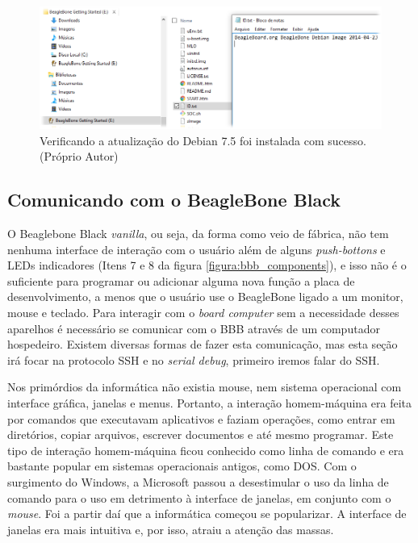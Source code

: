 \begin{figure}[h]
	\centering
	\includegraphics[width=\textwidth]{figuras/check_bbb_version.png}
	\caption{Verificando a atualização do Debian 7.5 foi instalada com sucesso. (Próprio Autor)}
	\label{figura:check_bbb_version}
\end{figure}

\subsection{Comunicando com o BeagleBone Black}

O Beaglebone Black \emph{vanilla}, ou seja, da forma como veio de fábrica, não tem nenhuma interface de interação com o usuário além de alguns \emph{push-bottons} e LEDs indicadores (Itens 7 e 8 da figura \ref{figura:bbb_components}), e isso não é o suficiente para programar ou adicionar alguma nova função a placa de desenvolvimento, a menos que o usuário use o BeagleBone ligado a um monitor, mouse e teclado. Para interagir com o \emph{board computer} sem a necessidade desses aparelhos é necessário se comunicar com o BBB através de um computador hospedeiro. Existem diversas formas de fazer esta comunicação, mas esta seção irá focar na protocolo SSH e no \emph{serial debug}, primeiro iremos falar do SSH.

Nos primórdios da informática não existia mouse, nem sistema operacional com interface gráfica, janelas e menus. Portanto, a interação homem-máquina era feita por comandos que executavam aplicativos e faziam operações, como entrar em diretórios, copiar arquivos, escrever documentos e até mesmo programar. Este tipo de interação homem-máquina ficou conhecido como linha de comando e era bastante popular em sistemas operacionais antigos, como DOS. Com o surgimento do Windows, a Microsoft passou a desestimular o uso da linha de comando para o uso em detrimento à interface de janelas, em conjunto com o \emph{mouse}. Foi a partir daí que a informática começou se popularizar. A interface de janelas era mais intuitiva e, por isso, atraiu a atenção das massas.

